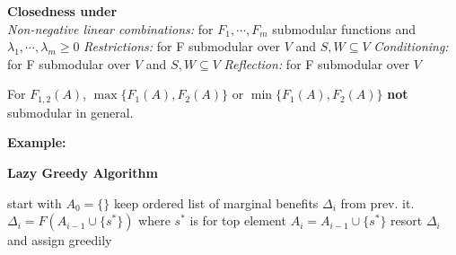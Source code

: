 \documentclass[10pt,parskip]{scrartcl}
\begin{document}
\begin{multicols*}{3}
\textbf{Closedness under}\\
\emph{Non-negative linear combinations: } for $F_1,\cdots,F_m$ submodular functions and $\lambda_1, \cdots, \lambda_m \geq 0$
\emph{Restrictions: } for F submodular over $V$ and $S,W \subseteq V$
\emph{Conditioning: } for F submodular over $V$ and $S,W \subseteq V$
\emph{Reflection: } for F submodular over $V$
\begin{mdframed}
	For $F_{1,2}(A)$, $\max \{F_1(A),F_2(A) \}$ or $\min \{F_1(A),F_2(A) \}$ \textbf{not} submodular in general.
\end{mdframed}

\textbf{Example: }

\textbf{Lazy Greedy Algorithm}
	\begin{algorithmic}
		\State start with $A_0=\{\}$
		\State keep ordered list of marginal benefits $\Delta_i$ from prev. it.
			\State $\Delta_i = F(A_{i-1} \cup \{s^\ast\})$ where $s^\ast$ is for top element
				\State $A_i = A_{i-1} \cup \{s^\ast\}$
			\Else
				\State resort $\Delta_i$ and assign greedily
			\EndIf
		\EndFor
	\end{algorithmic}




\end{multicols*}
\end{document}
